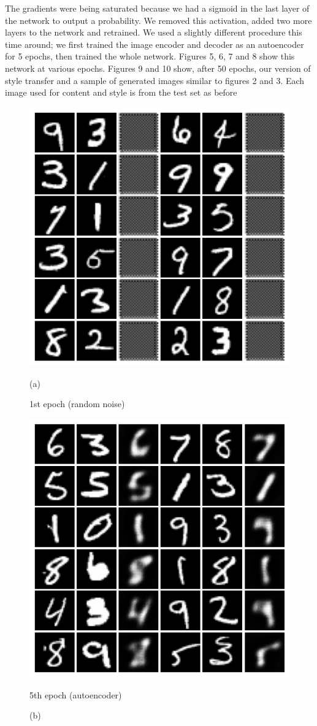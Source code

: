 \documentclass{article}
\begin{document}
The gradients were being saturated because we had a sigmoid in the last layer of the network to output a probability.
We removed this activation, added two more layers to the network and retrained.
We used a slightly different procedure this time around;
we first trained the image encoder and decoder as an autoencoder for 5 epochs, then trained the whole network.
Figures 5, 6, 7 and 8 show this network at various epochs.
Figures 9 and 10 show, after 50 epochs, our version of style transfer and a sample of generated images similar to figures 2 and 3.
Each image used for content and style is from the test set as before


\begin{figure}[hbt]
	\centering
	\begin{minipage}{.5\textwidth}
		\centering
		\includegraphics[width=.8\linewidth]{images/mnist_transfer_crisp_1.png}
		\caption{(a)}{1st epoch (random noise)}
		\label{fig:sub3}
	\end{minipage}%
	\begin{minipage}{.5\textwidth}
		\centering
		\includegraphics[width=.8\linewidth]{images/mnist_transfer_crisp_5.png}
		\caption{(b)}{5th epoch (autoencoder)}
		\label{fig:sub4}
	\end{minipage}
\end{figure}
\end{document}
